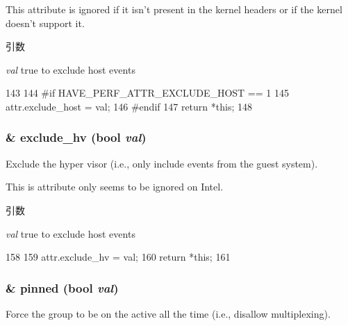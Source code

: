 This attribute is ignored if it isn't present in the kernel headers or if the kernel doesn't support it.


\begin{DoxyParams}{引数}
\item[{\em val}]true to exclude host events \end{DoxyParams}



\begin{DoxyCode}
143                                                  {
144 #if HAVE_PERF_ATTR_EXCLUDE_HOST == 1
145         attr.exclude_host = val;
146 #endif
147         return *this;
148     }
\end{DoxyCode}
\hypertarget{classPerfKvmCounterConfig_a267e4dd365a444393b1ccce9e564f7af}{
\subsubsection[{exclude\_\-hv}]{\& exclude\_\-hv (bool {\em val})}}
\label{classPerfKvmCounterConfig_a267e4dd365a444393b1ccce9e564f7af}
Exclude the hyper visor (i.e., only include events from the guest system).

This is attribute only seems to be ignored on Intel.


\begin{DoxyParams}{引数}
\item[{\em val}]true to exclude host events \end{DoxyParams}



\begin{DoxyCode}
158                                                {
159         attr.exclude_hv = val;
160         return *this;
161     }
\end{DoxyCode}
\hypertarget{classPerfKvmCounterConfig_a6ff9b5b670a7713d60a49071544ef39d}{
\subsubsection[{pinned}]{\& pinned (bool {\em val})}}
\label{classPerfKvmCounterConfig_a6ff9b5b670a7713d60a49071544ef39d}
Force the group to be on the active all the time (i.e., disallow multiplexing).


